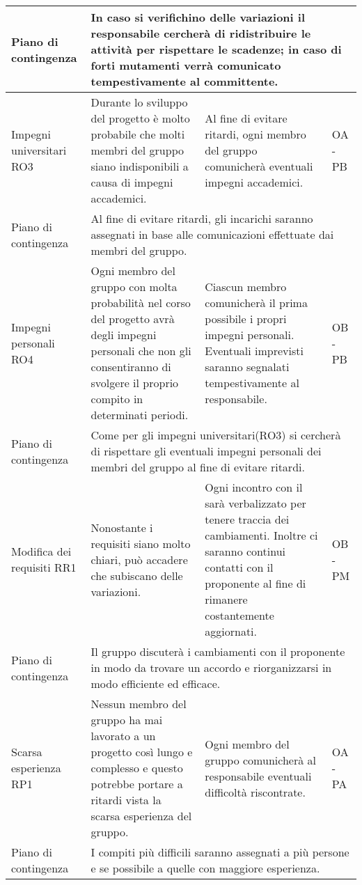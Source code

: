 \begin{center}
\begin{longtable}{|p{}|p{}|p{}|p{}|}
		\hline
		\centering Piano di contingenza & \multicolumn{3}{p{0.84\textwidth}}{In caso si verifichino delle variazioni il responsabile cercherà di ridistribuire le attività per rispettare le scadenze; in caso di forti mutamenti verrà comunicato tempestivamente al committente.  } \\
		\hline
		\centering Impegni universitari RO3& Durante lo sviluppo del progetto è molto probabile che molti membri del gruppo siano indisponibili a causa di impegni accademici.  &Al fine di evitare ritardi, ogni membro del gruppo comunicherà eventuali impegni accademici. & OA - PB \\
		\hline 
		\centering Piano di contingenza & \multicolumn{3}{p{0.84\textwidth}}{Al fine di evitare ritardi, gli incarichi saranno assegnati in base alle comunicazioni effettuate dai membri del gruppo.} \\
		\hline
		\centering Impegni personali RO4& Ogni membro del gruppo con molta probabilità nel corso del progetto avrà degli impegni personali che non gli consentiranno di svolgere il proprio compito in determinati periodi. & Ciascun membro comunicherà il prima possibile i propri impegni personali. Eventuali imprevisti saranno segnalati tempestivamente al responsabile. & OB - PB \\
		\hline
		\centering Piano di contingenza & \multicolumn{3}{p{0.84\textwidth}}{Come per gli impegni universitari(RO3) si cercherà di rispettare gli eventuali impegni personali dei membri del gruppo al fine di evitare ritardi.} \\
		\hline
		\centering Modifica dei requisiti RR1& Nonostante i requisiti siano molto chiari, può accadere che subiscano delle variazioni.  & Ogni incontro con il \glock{proponente} sarà verbalizzato per tenere traccia dei cambiamenti. Inoltre ci saranno continui contatti con il proponente al fine di rimanere costantemente aggiornati. & OB - PM \\
		\hline
		\centering Piano di contingenza & \multicolumn{3}{p{0.84\textwidth}}{Il gruppo discuterà i cambiamenti con il proponente in modo da trovare un accordo e riorganizzarsi in modo efficiente ed efficace.} \\
		\hline
		\centering Scarsa esperienza RP1& Nessun membro del gruppo ha mai lavorato a un progetto così lungo e complesso e questo potrebbe portare a ritardi vista la scarsa esperienza del gruppo. & Ogni membro del gruppo comunicherà al responsabile eventuali difficoltà riscontrate. & OA - PA \\
		\hline
		\centering Piano di contingenza & \multicolumn{3}{p{0.84\textwidth}}{I compiti più difficili saranno assegnati a più persone e se possibile a quelle con maggiore esperienza.} \\

\end{longtable}
\end{center}
